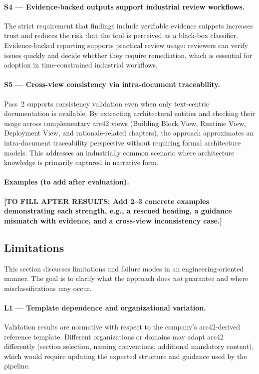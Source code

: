 \paragraph{S4 --- Evidence-backed outputs support industrial review workflows.}
The strict requirement that findings include verifiable evidence snippets increases trust and reduces the risk that the tool is perceived as a black-box classifier. Evidence-backed reporting supports practical review usage: reviewers can verify issues quickly and decide whether they require remediation, which is essential for adoption in time-constrained industrial workflows.

\paragraph{S5 --- Cross-view consistency via intra-document traceability.}
Pass~2 supports consistency validation even when only text-centric documentation is available. By extracting architectural entities and checking their usage across complementary arc42 views (Building Block View, Runtime View, Deployment View, and rationale-related chapters), the approach approximates an intra-document traceability perspective without requiring formal architecture models. This addresses an industrially common scenario where architecture knowledge is primarily captured in narrative form.

\paragraph{Examples (to add after evaluation).}
\textbf{[TO FILL AFTER RESULTS: Add 2--3 concrete examples demonstrating each strength, e.g., a rescued heading, a guidance mismatch with evidence, and a cross-view inconsistency case.]}

\subsection{Limitations}
\label{sec:discussion_limitations}

This section discusses limitations and failure modes in an engineering-oriented manner. The goal is to clarify what the approach does \emph{not} guarantee and where misclassifications may occur.

\paragraph{L1 --- Template dependence and organizational variation.}
Validation results are normative with respect to the company’s arc42-derived reference template. Different organizations or domains may adapt arc42 differently (section selection, naming conventions, additional mandatory content), which would require updating the expected structure and guidance used by the pipeline.


